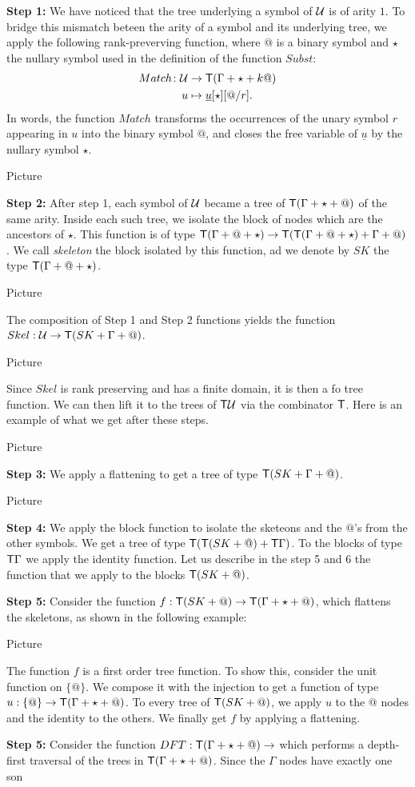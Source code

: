 \medskip
\noindent\textbf{Step 1:} We have noticed that the tree underlying a symbol of ${\mathcal U}$ is of arity $1$. To bridge this mismatch beteen the arity of a symbol and its underlying tree, we apply the following
rank-preverving function, where $@$ is a binary symbol and $\star$ the nullary symbol used in the definition of the function $Subst$:
 \begin{align*}
  Match\colon {\mathcal U} &\to \mathsf T(\Gamma+\star+k@)\\
  u &\mapsto \underline{u}[\star][@/r].
\end{align*} 
In words, the function $Match$ transforms the occurrences of the unary symbol $r$ appearing in $u$ into the binary symbol $@$, and closes the free variable of $\underline{u}$ by the nullary symbol $\star$.
\begin{center}
Picture
\end{center}
\medskip
\textbf{Step 2:} After step 1, each symbol of ${\mathcal U}$ became a tree of $\mathsf T(\Gamma+\star+@)$ of the same arity. Inside each such tree, we isolate the block of nodes which are the ancestors of $\star$. This function is of type $\mathsf T(\Gamma+@+\star)\to \mathsf T (\mathsf T (\Gamma+@+\star)+\Gamma+@)$. We call \emph{skeleton} the block isolated by this function, ad we denote by 
$SK$ the type $\mathsf T (\Gamma+@+\star)$.
\begin{center}
Picture
\end{center}
The composition of Step 1 and Step 2 functions yields the function $Skel:{\mathcal U}\to \mathsf T (SK+\Gamma+@)$. 
\begin{center}
Picture
\end{center}
Since $Skel$ is rank preserving and has a finite domain, it is then a fo tree function. We can then lift it to the trees of $\mathsf T {\mathcal U}$ via the combinator $\mathsf T$. Here is an example of what we get after these steps.
\begin{center}
Picture
\end{center}
 \medskip
\textbf{Step 3:} We apply a flattening to get a tree of type $\mathsf T(SK+\Gamma+@)$. 
\begin{center}
Picture
\end{center}
\medskip
\textbf{Step 4:} We apply the block function to isolate the sketeons and the $@$'s from the other symbols. We get a tree of type $\mathsf T (\mathsf T(SK+@)+\mathsf T\Gamma)$. To the blocks of type $\mathsf T \Gamma$ we apply the identity function. Let us describe in the step 5 and 6 the function that we apply to the blocks $\mathsf T(SK+@)$.

\medskip
\noindent \textbf{Step 5:} Consider the function $f:\mathsf T(SK+@)\to\mathsf T(\Gamma+\star+@)$, which flattens the skeletons, as shown in the following example:
\begin{center}
Picture
\end{center}
The function $f$ is a first order tree function. To show this, consider the unit function on 
$\{@\}$. We compose it with the injection to get a function of type $u:\{@\}\to \mathsf T(\Gamma+\star+@)$.  To every tree of $\mathsf T(SK+@)$, we apply $u$ to the $@$ nodes and the identity to the others. We finally get $f$ by applying a flattening.

\medskip
\noindent \textbf{Step 5:} Consider the function $DFT: \mathsf T(\Gamma+\star+@)\to $ which performs a depth-first traversal of the trees in $\mathsf T(\Gamma+\star+@)$. Since the $\Gamma$ nodes have exactly one son 